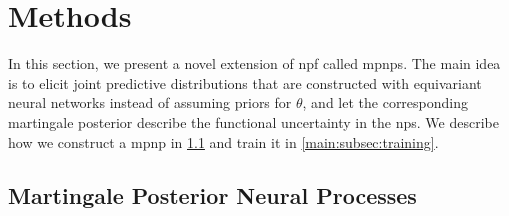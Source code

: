 \section{Methods}
\label{main:sec:methods}
In this section, we present a novel extension of \gls{npf} called \glspl{mpnp}. The main idea is to elicit joint predictive distributions that are constructed with equivariant neural networks instead of assuming priors for $\theta$, and let the corresponding martingale posterior describe the functional uncertainty in the \glspl{np}. We describe how we construct a \gls{mpnp} in \cref{main:subsec:mpnp} and train it in \cref{main:subsec:training}.


\subsection{Martingale Posterior Neural Processes}\label{main:subsec:mpnp}


